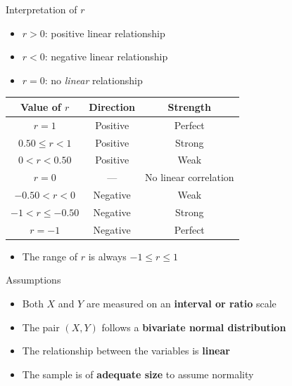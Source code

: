 \documentclass[12pt, aspectratio=169]{beamer}
\begin{document}
    \begin{frame}{Interpretation of $r$}
        \begin{itemize}
            \item $r > 0$: positive linear relationship
            \item $r < 0$: negative linear relationship
            \item $r = 0$: no \emph{linear} relationship
        \end{itemize}

        \vspace{0.4em}

        \begin{center}
            \small
            \begin{tabular}{ccc}
                \toprule
                \textbf{Value of $r$} & \textbf{Direction} & \textbf{Strength} \\
                \midrule
                $r = 1$ & Positive & Perfect \\
                $0.50 \leqslant r < 1$ & Positive & Strong \\
                $0 < r < 0.50$ & Positive & Weak \\
                $r = 0$ & --- & No linear correlation \\
                $-0.50 < r < 0$ & Negative & Weak \\
                $-1 < r \leqslant -0.50$ & Negative & Strong \\
                $r = -1$ & Negative & Perfect \\
                \bottomrule
            \end{tabular}
        \end{center}

        \vspace{0.3em}

        \begin{itemize}
            \item The range of $r$ is always $-1 \leqslant r \leqslant 1$
        \end{itemize}
    \end{frame}


    \begin{frame}{Assumptions}
        \begin{itemize}
            \item Both $X$ and $Y$ are measured on an \textbf{interval or ratio}
                scale
            \item The pair $(X, Y)$ follows a \textbf{bivariate normal
                distribution}
            \item The relationship between the variables is \textbf{linear}
            \item The sample is of \textbf{adequate size} to assume normality
        \end{itemize}
    \end{frame}
\end{document}
